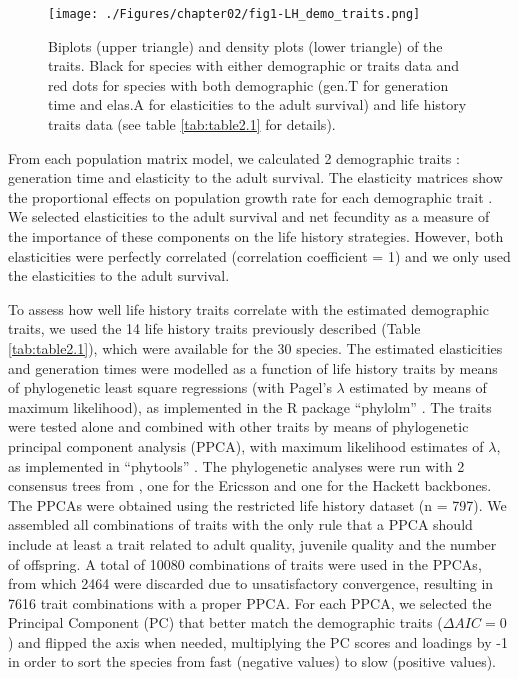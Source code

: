 \begin{figure}
\centering
\texttt{[image: ./Figures/chapter02/fig1-LH\_demo\_traits.png]}
\caption[Traits distribution]{
Biplots (upper triangle) and density plots (lower triangle) of the traits. 
Black for species with either demographic or traits data and red dots for 
species with both demographic (gen.T for generation time and elas.A for 
elasticities to the adult survival) and life history traits data (see table
\ref{tab:table2.1} for details).}
\label{fig:fig2.1}
\end{figure}

From each population matrix model, we calculated 2 demographic 
traits \citep{Caswell2001,Stubben2007}: generation time and elasticity to the
adult survival. The elasticity matrices show the proportional effects on 
population growth rate for each demographic trait \citep{deKroon2000}⁠. We 
selected elasticities to the adult survival and net fecundity as a measure of
the importance of these components on the life history strategies. However, both
elasticities were perfectly correlated (correlation coefficient = 1) and we only 
used the elasticities to the adult survival.

To assess how well life history traits correlate with the estimated demographic 
traits, we used the 14 life history traits previously described (Table 
\ref{tab:table2.1}), which were available for the 30 species. The estimated 
elasticities and generation times were modelled as a function of life history 
traits by means of phylogenetic least square regressions (with Pagel’s 
$\lambda$ estimated by means of maximum likelihood), as implemented in the R 
package “phylolm” \citep{Ho2014}⁠. The traits were tested alone and combined 
with other traits by means of phylogenetic principal component analysis 
(PPCA), with maximum likelihood estimates of $\lambda$, as implemented in 
“phytools” \citep{Revell2009a}⁠. The phylogenetic analyses were run with 
2 consensus trees from \citet{Jetz2012}, one for the Ericsson and 
one for the Hackett backbones.
The PPCAs were obtained using the restricted life history dataset (n = 797). We 
assembled all combinations of traits with the only rule that a PPCA should 
include at least a trait related to adult quality, juvenile quality and the 
number of offspring. A total of 10080 combinations of traits were used in the 
PPCAs, from which 2464 were discarded due to unsatisfactory convergence, 
resulting in 7616 trait combinations with a proper PPCA. For each PPCA, we 
selected the Principal Component (PC) that better match the demographic traits 
($\Delta AIC = 0$) and flipped the axis when 
needed, multiplying the PC scores and loadings by -1 in order to sort the 
species from fast (negative values) to slow (positive values).

